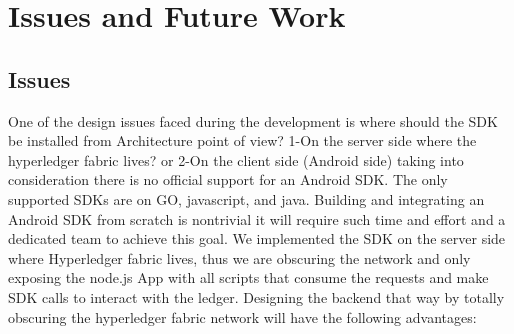 \chapter{Issues and Future Work}


\section{Issues} 
One of the design issues faced during the development is where should the SDK be installed from Architecture point of view?
1-On the server side where the hyperledger fabric lives?  or 2-On the client side (Android side) taking into consideration there is no official support for an Android SDK. The only supported SDKs are on GO, javascript, and java.
Building and integrating an Android SDK from scratch is nontrivial it will require such time and effort and a dedicated team to achieve this goal.   
We implemented the SDK on the server side where Hyperledger fabric lives, thus we are obscuring the network and only exposing the node.js App with all scripts that consume the requests and make SDK calls to interact with the ledger. Designing the backend that way by totally obscuring the hyperledger fabric network will have the following advantages: 

